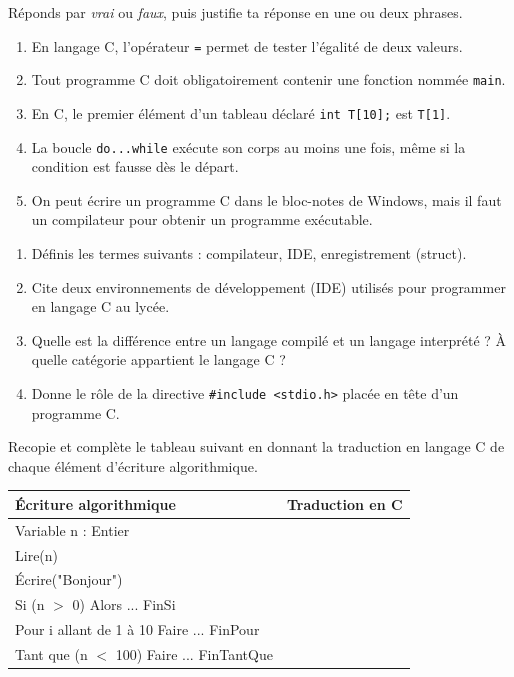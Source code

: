 \documentclass[11pt]{article}
\newcommand{\cle}[1]{{\popxbold\color{popdark}#1}}
\begin{document}
\begin{exercice}
Réponds par \emph{vrai} ou \emph{faux}, puis justifie ta réponse en une ou deux phrases.
\begin{enumerate}
  \item En langage C, l'opérateur \texttt{=} permet de tester l'égalité de deux valeurs.
  \item Tout programme C doit obligatoirement contenir une fonction nommée \texttt{main}.
  \item En C, le premier élément d'un tableau déclaré \texttt{int T[10];} est \texttt{T[1]}.
  \item La boucle \texttt{do...while} exécute son corps au moins une fois, même si la condition est fausse dès le départ.
  \item On peut écrire un programme C dans le bloc-notes de Windows, mais il faut un compilateur pour obtenir un programme exécutable.
\end{enumerate}
\end{exercice}

\begin{exercice}
\begin{enumerate}
  \item Définis les termes suivants : \cle{compilateur}, \cle{IDE}, \cle{enregistrement} (struct).
  \item Cite deux environnements de développement (IDE) utilisés pour programmer en langage C au lycée.
  \item Quelle est la différence entre un \cle{langage compilé} et un \cle{langage interprété} ? À quelle catégorie appartient le langage C ?
  \item Donne le rôle de la directive \texttt{\#include <stdio.h>} placée en tête d'un programme C.
\end{enumerate}
\end{exercice}

\begin{exercice}
Recopie et complète le tableau suivant en donnant la traduction en langage C de chaque élément d'écriture algorithmique.

\begin{center}
\begin{tabularx}{\linewidth}{|l|X|}
\hline
\rowcolor{popblueL} \textbf{Écriture algorithmique} & \textbf{Traduction en C} \\
\hline
Variable n : Entier & \\
\hline
Lire(n) & \\
\hline
Écrire("Bonjour") & \\
\hline
Si (n $>$ 0) Alors ... FinSi & \\
\hline
Pour i allant de 1 à 10 Faire ... FinPour & \\
\hline
Tant que (n $<$ 100) Faire ... FinTantQue & \\
\hline
\end{tabularx}
\end{center}
\end{exercice}
\end{document}
